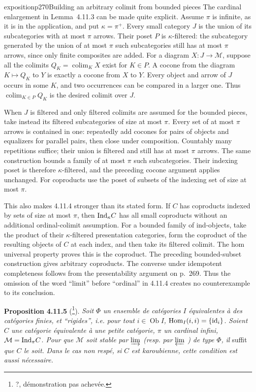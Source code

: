 \begin{dcomment}{exposition}{p270}{Building an arbitrary colimit from bounded pieces}
The cardinal enlargement in Lemma~4.11.3 can be made quite explicit. Assume $\pi$ is infinite, as it is in the application, and put $\kappa=\pi^+$. Every small category $J$ is the union of its subcategories with at most $\pi$ arrows. Their poset $P$ is $\kappa$-filtered: the subcategory generated by the union of at most $\pi$ such subcategories still has at most $\pi$ arrows, since only finite composites are added. For a diagram $X:J\to\mathcal M$, suppose all the colimits $Q_K=\operatorname{colim}_{K}X$ exist for $K\in P$. A cocone from the diagram $K\mapsto Q_K$ to $Y$ is exactly a cocone from $X$ to $Y$. Every object and arrow of $J$ occurs in some $K$, and two occurrences can be compared in a larger one. Thus $\operatorname{colim}_{K\in P}Q_K$ is the desired colimit over $J$.

When $J$ is filtered and only filtered colimits are assumed for the bounded pieces, take instead its filtered subcategories of size at most $\pi$. Every set of at most $\pi$ arrows is contained in one: repeatedly add cocones for pairs of objects and equalizers for parallel pairs, then close under composition. Countably many repetitions suffice; their union is filtered and still has at most $\pi$ arrows. The same construction bounds a family of at most $\pi$ such subcategories. Their indexing poset is therefore $\kappa$-filtered, and the preceding cocone argument applies unchanged. For coproducts use the poset of subsets of the indexing set of size at most $\pi$.

This also makes 4.11.4 stronger than its stated form. If $C$ has coproducts indexed by sets of size at most $\pi$, then $\mathrm{Ind}_\kappa C$ has all small coproducts without an additional ordinal-colimit assumption. For a bounded family of ind-objects, take the product of their $\kappa$-filtered presentation categories, form the coproduct of the resulting objects of $C$ at each index, and then take its filtered colimit. The hom universal property proves this is the coproduct. The preceding bounded-subset construction gives arbitrary coproducts. The converse under idempotent completeness follows from the presentability argument on p.~269. Thus the omission of the word ``limit'' before ``ordinal'' in 4.11.4 creates no counterexample to its conclusion.
\end{dcomment}


\textbf{Proposition 4.11.5} (\footnote{?, démonstration pas achevée.}). \textit{Soit $\Phi$ un ensemble de catégories $I$ équivalentes à des catégories finies, et “rigides”, i.e. pour tout $i \in \operatorname{Ob} I$, $\operatorname{Hom}_I(i,i) = \{\mathrm{id}_i\}$. Soient $C$ une catégorie équivalente à une petite catégorie, $\pi$ un cardinal infini, $\mathcal{M} = \mathrm{Ind}_\pi C$. Pour que $\mathcal{M}$ soit stable par $\varinjlim$ (resp. par $\varprojlim$ ) de type $\Phi$, il} suffit \textit{que $C$ le soit. Dans le cas non respé, si $C$ est karoubienne, cette condition est aussi nécessaire.}

